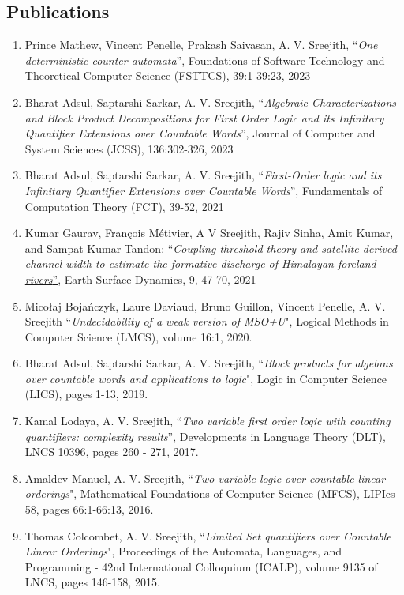 \documentclass[margin]{res}
\begin{document}
\begin{resume}
\section{Publications}
\begin{enumerate}
\item Prince Mathew, Vincent Penelle, Prakash Saivasan, A. V. Sreejith, ``\emph{One deterministic counter automata}'', Foundations of Software Technology and Theoretical Computer Science (FSTTCS), 39:1-39:23, 2023
\item Bharat Adsul, Saptarshi Sarkar, A. V. Sreejith, ``\emph{Algebraic Characterizations and Block Product Decompositions for First Order Logic and its Infinitary Quantifier Extensions over Countable Words}'', Journal of Computer and System Sciences (JCSS), 136:302-326, 2023
\item Bharat Adsul, Saptarshi Sarkar, A. V. Sreejith, ``\emph{First-Order logic and its Infinitary Quantifier Extensions over Countable Words}'', Fundamentals of Computation Theory (FCT), 39-52, 2021
\item Kumar Gaurav, Fran\c{c}ois M\'etivier, A V Sreejith, Rajiv Sinha, Amit Kumar, and Sampat Kumar Tandon: \href{https://doi.org/10.5194/esurf-9-47-2021}{``\emph{Coupling threshold theory and satellite-derived channel width to estimate the formative discharge of Himalayan foreland rivers}''}, Earth Surface Dynamics, 9, 47-70, 2021
\item Mico\l{}aj Boja\'nczyk, Laure Daviaud, Bruno Guillon, Vincent Penelle, A. V. Sreejith ``\emph{Undecidability of a weak version of MSO+U}", Logical Methods in Computer Science (LMCS), volume 16:1, 2020.
\item Bharat Adsul, Saptarshi Sarkar, A. V. Sreejith, ``\emph{Block products for algebras over countable words and applications to logic}", Logic in Computer Science (LICS), pages 1-13, 2019.
\item Kamal Lodaya, A. V. Sreejith, ``\emph{Two variable first order logic with counting quantifiers: complexity results}'', Developments in Language Theory (DLT), LNCS 10396, pages 260 - 271, 2017.
\item Amaldev Manuel, A. V. Sreejith, ``\emph{Two variable logic over countable linear orderings}", Mathematical Foundations of Computer Science (MFCS), LIPIcs 58, pages 66:1-66:13, 2016. 
\item Thomas Colcombet, A. V. Sreejith, ``\emph{Limited Set quantifiers over Countable Linear Orderings}", Proceedings of the Automata, Languages, and Programming - 42nd International Colloquium (ICALP), volume 9135 of LNCS, pages 146-158, 2015. 

\end{enumerate}
\end{resume}
\end{document}
